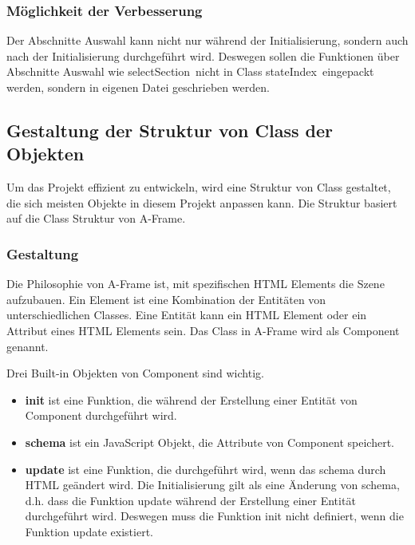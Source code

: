   \subsubsection{Möglichkeit der Verbesserung}
  Der Abschnitte Auswahl kann nicht nur während der Initialisierung, sondern auch nach der Initialisierung durchgeführt wird. Deswegen sollen die Funktionen über Abschnitte Auswahl wie \glqq selectSection\grqq\ nicht in Class \glqq stateIndex\grqq\ eingepackt werden, sondern in eigenen Datei geschrieben werden.
  
 \subsection{Gestaltung der Struktur von Class der Objekten}
 Um das Projekt effizient zu entwickeln, wird eine Struktur von Class gestaltet, die sich meisten Objekte in diesem Projekt anpassen kann. Die Struktur basiert auf die Class Struktur von A-Frame.
 
 \subsubsection{Gestaltung}
 Die Philosophie von A-Frame ist, mit spezifischen HTML Elements die Szene aufzubauen. Ein Element ist eine Kombination der Entitäten von unterschiedlichen Classes. Eine Entität kann ein HTML Element oder ein Attribut eines HTML Elements sein. Das Class in A-Frame wird als Component genannt.
 
 Drei Built-in Objekten von Component sind wichtig.
 \begin{itemize}
     \item \textbf{init} ist eine Funktion, die während der Erstellung einer Entität von Component durchgeführt wird.
     \item \textbf{schema} ist ein JavaScript Objekt, die Attribute von Component speichert.
     \item \textbf{update} ist eine Funktion, die durchgeführt wird, wenn das schema durch HTML geändert wird. Die Initialisierung gilt als eine Änderung von schema, d.h. dass die Funktion update während der Erstellung einer Entität durchgeführt wird. Deswegen muss die Funktion init nicht definiert, wenn die Funktion update existiert.
 \end{itemize}
 
